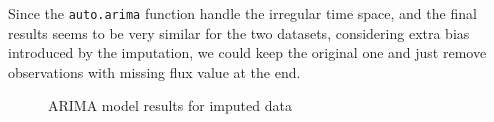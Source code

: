 \documentclass[
]{article}
\begin{document}
Since the \texttt{auto.arima} function handle the irregular time space, and the final results seems to be very similar for the two datasets, considering extra bias introduced by the imputation, we could keep the original one and just remove observations with missing flux value at the end.

\begin{figure}[H]

{\centering {}

}

\caption{ARIMA model results for imputed data}\label{fig:ts}
\end{figure}
\end{document}
